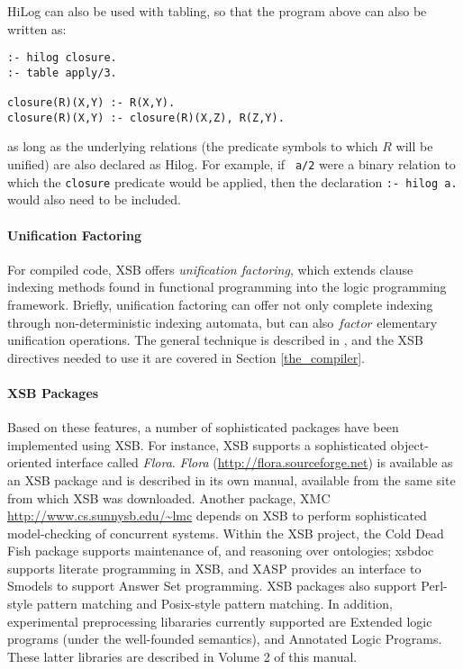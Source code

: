 HiLog can also be used with tabling, so that the program above can also be
written as:
\begin{center}
\begin{minipage}{3.7in}
\begin{verbatim}
:- hilog closure.
:- table apply/3.

closure(R)(X,Y) :- R(X,Y).
closure(R)(X,Y) :- closure(R)(X,Z), R(Z,Y).
\end{verbatim}
\end{minipage}
\end{center}
as long as the underlying relations (the predicate symbols to which
$R$ will be unified) are also declared as Hilog.  For example, if {\tt
a/2} were a binary relation to which the {\tt closure} predicate would
be applied, then the declaration {\tt :- hilog a.} would also need to
be included.

\paragraph{Unification Factoring} For compiled code, XSB offers {\em
  unification factoring}, which extends clause indexing methods found
in functional programming into the logic programming framework.
Briefly, unification factoring can offer not only complete indexing
through non-deterministic indexing automata, but can also $factor$
elementary unification operations.  The general technique is described
in \cite{DRSS96}, and the XSB directives needed to use it are covered
in Section \ref{the_compiler}.

  
\paragraph{XSB Packages} Based on these features, a number of
sophisticated packages have been implemented using XSB.  For instance,
XSB supports a sophisticated object-oriented interface called {\em
  Flora}.  {\em Flora} (\url{http://flora.sourceforge.net}) is
available as an XSB package and is described in its own manual,
available from the same site from which XSB was downloaded.  Another
package, XMC \url{http://www.cs.sunnysb.edu/~lmc} depends on XSB to
perform sophisticated model-checking of concurrent systems.  Within
the XSB project, the Cold Dead Fish package supports maintenance of,
and reasoning over ontologies; xsbdoc supports literate programming in
XSB, and XASP provides an interface to Smodels to support Answer Set
programming.  XSB packages also support Perl-style pattern matching
and Posix-style pattern matching.  In addition, experimental
preprocessing libararies currently supported are Extended logic
programs (under the well-founded semantics), and Annotated Logic
Programs.  These latter libraries are described in Volume 2 of this
manual.

